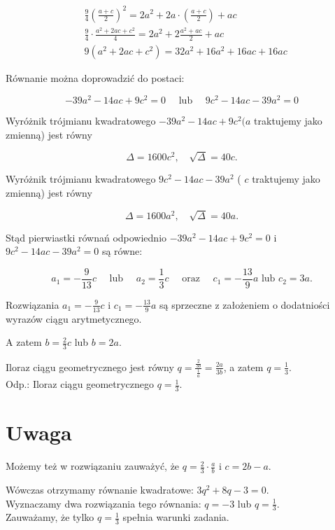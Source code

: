\documentclass[10pt]{article}
\begin{document}
$$
\begin{aligned}
& \frac{9}{4}\left(\frac{a+c}{2}\right)^{2}=2 a^{2}+2 a \cdot\left(\frac{a+c}{2}\right)+a c \\
& \frac{9}{4} \cdot \frac{a^{2}+2 a c+c^{2}}{4}=2 a^{2}+2 \frac{a^{2}+a c}{2}+a c \\
& 9\left(a^{2}+2 a c+c^{2}\right)=32 a^{2}+16 a^{2}+16 a c+16 a c
\end{aligned}
$$

Równanie można doprowadzić do postaci:

$$
-39 a^{2}-14 a c+9 c^{2}=0 \quad \text { lub } \quad 9 c^{2}-14 a c-39 a^{2}=0
$$

Wyróżnik trójmianu kwadratowego $-39 a^{2}-14 a c+9 c^{2}(a$ traktujemy jako zmienną) jest równy

$$
\Delta=1600 c^{2}, \quad \sqrt{\Delta}=40 c .
$$

Wyróżnik trójmianu kwadratowego $9 c^{2}-14 a c-39 a^{2}$ ( $c$ traktujemy jako zmienną) jest równy

$$
\Delta=1600 a^{2}, \quad \sqrt{\Delta}=40 a .
$$

Stąd pierwiastki równań odpowiednio $-39 a^{2}-14 a c+9 c^{2}=0$ i $9 c^{2}-14 a c-39 a^{2}=0$ są równe:

$$
a_{1}=-\frac{9}{13} c \quad \text { lub } \quad a_{2}=\frac{1}{3} c \quad \text { oraz } \quad c_{1}=-\frac{13}{9} a \text { lub } c_{2}=3 a .
$$

Rozwiązania $a_{1}=-\frac{9}{13} c$ i $c_{1}=-\frac{13}{9} a$ są sprzeczne z założeniem o dodatniości wyrazów ciągu arytmetycznego.

A zatem $b=\frac{2}{3} c$ lub $b=2 a$.

Iloraz ciągu geometrycznego jest równy $q=\frac{\frac{2}{3 b}}{\frac{1}{a}}=\frac{2 a}{3 b}$, a zatem $q=\frac{1}{3}$.\\
Odp.: Iloraz ciągu geometrycznego $q=\frac{1}{3}$.

\section*{Uwaga}
Możemy też w rozwiązaniu zauważyć, że $q=\frac{2}{3} \cdot \frac{a}{b}$ i $c=2 b-a$.

Wówczas otrzymamy równanie kwadratowe: $3 q^{2}+8 q-3=0$.\\
Wyznaczamy dwa rozwiązania tego równania: $q=-3$ lub $q=\frac{1}{3}$.\\
Zauważamy, że tylko $q=\frac{1}{3}$ spełnia warunki zadania.
\end{document}
